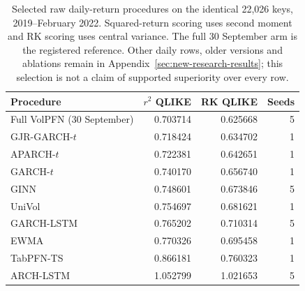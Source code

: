 \begin{table}[!htbp]\centering
\begingroup\small\setlength{\tabcolsep}{4pt}
\caption[Selected common-period daily scores]{Selected raw daily-return procedures on the identical 22,026 keys, 2019--February 2022. Squared-return scoring uses second moment and RK scoring uses central variance. The full 30 September arm is the registered reference. Other daily rows, older versions and ablations remain in Appendix~\ref{sec:new-research-results}; this selection is not a claim of supported superiority over every row.}\label{tab:new-daily-common}
\begin{tabular}{@{}>{\raggedright\arraybackslash}p{6.5cm}rrr@{}}
\toprule
Procedure & $r^2$ QLIKE & RK QLIKE & Seeds \\
\midrule
Full VolPFN (30 September) & 0.703714 & 0.625668 & 5 \\
GJR-GARCH-$t$ & 0.718424 & 0.634702 & 1 \\
APARCH-$t$ & 0.722381 & 0.642651 & 1 \\
GARCH-$t$ & 0.740170 & 0.656740 & 1 \\
GINN & 0.748601 & 0.673846 & 5 \\
UniVol & 0.754697 & 0.681621 & 1 \\
GARCH-LSTM & 0.765202 & 0.710314 & 5 \\
EWMA & 0.770326 & 0.695458 & 1 \\
TabPFN-TS & 0.866181 & 0.760323 & 1 \\
ARCH-LSTM & 1.052799 & 1.021653 & 5 \\
\bottomrule
\end{tabular}\endgroup\end{table}
